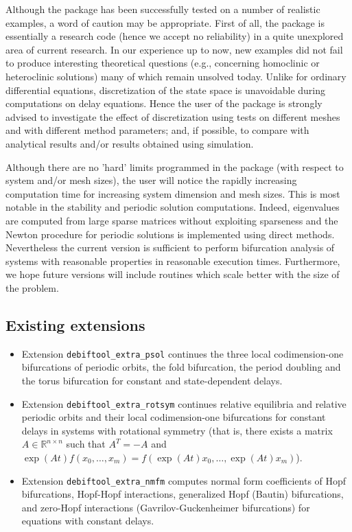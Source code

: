 \documentclass[10pt]{scrartcl}
\newcommand{\RR}{\mathbb{R}}
\begin{document}
{Although
the package has been successfully tested on a number of realistic examples,
a word of caution may be appropriate. First of all, the package
is essentially a research code (hence we accept no
reliability) in a quite unexplored area of current
research. In our experience up to now, 
new examples did not fail to produce
interesting theoretical questions (e.g., concerning homoclinic
or heteroclinic solutions) many of which
remain unsolved today. 
Unlike for ordinary differential equations, discretization
of the state space is unavoidable during computations on
delay equations. Hence the user of the package is 
strongly advised 
to investigate the effect of discretization using tests on different
meshes and with different method parameters; and, if
possible, to compare with analytical results and/or results obtained
using simulation.

Although there are no 'hard' limits programmed in the package (with
respect to system and/or mesh sizes), the user will notice the rapidly
increasing computation time for increasing system dimension and mesh
sizes.  This is most notable in the stability and periodic solution
computations.  Indeed, eigenvalues are computed from large sparse
matrices without exploiting sparseness and the Newton procedure for
periodic solutions is implemented using direct methods.  Nevertheless
the current version is sufficient to perform bifurcation analysis of
systems with reasonable properties in reasonable execution times.
Furthermore, we hope future versions will include routines which scale
better with the size of the problem.

\subsection{Existing extensions}
\label{sec:extensions}
\begin{itemize}
\item Extension \texttt{debiftool\_extra\_psol} continues the three
  local co\-dim\-ension-one bifurcations of periodic orbits, the fold
  bifurcation, the period doubling and the torus bifurcation for
  constant and state-dependent delays.
\item Extension \texttt{debiftool\_extra\_rotsym} continues relative
  equilibria and relative periodic orbits and their local
  codimension-one bifurcations for constant delays in systems with
  rotational symmetry (that is, there exists a matrix
  $A\in\RR^{n\times n}$ such that $A^T=-A$ and
  $\exp(At)f(x_0,\ldots,x_m)=f(\exp(At)x_0,\ldots,\exp(At)x_m)$).
\item Extension \texttt{debiftool\_extra\_nmfm} computes normal form
  coefficients of Hopf bifurcations, Hopf-Hopf interactions,
  generalized Hopf (Bautin) bifurcations, and zero-Hopf interactions
  (Gavrilov-Guckenheimer bifurcations) for equations with constant
  delays.
\end{itemize}


}
\end{document}
